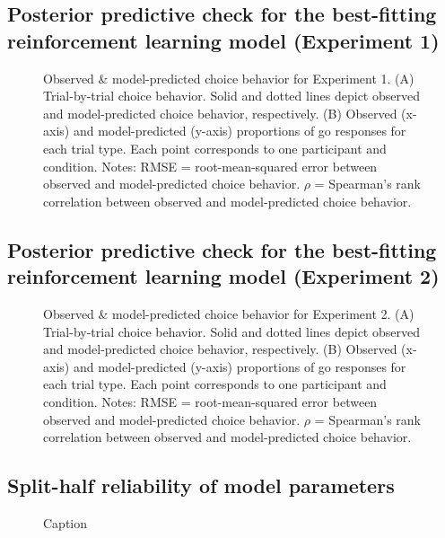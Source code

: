 \documentclass[a4paper,12pt]{article}
\begin{document}
\begin{refsection}[supp]
\break
\subsection*{Posterior predictive check for the best-fitting reinforcement learning model (Experiment 1)}

\begin{figure}[h]
    \centerline{}
    \caption{Observed \& model-predicted choice behavior for Experiment 1. (A) Trial-by-trial choice behavior. Solid and dotted lines depict observed and model-predicted choice behavior, respectively. (B) Observed (x-axis) and model-predicted (y-axis) proportions of go responses for each trial type. Each point corresponds to one participant and condition. Notes: RMSE = root-mean-squared error between observed and model-predicted choice behavior. $\rho$ = Spearman's rank correlation between observed and model-predicted choice behavior.}
    \label{fig:exp1_ppc}
\end{figure}

\clearpage
\subsection*{Posterior predictive check for the best-fitting reinforcement learning model (Experiment 2)}

\begin{figure}[h]
    \centerline{}
     \caption{Observed \& model-predicted choice behavior for Experiment 2. (A) Trial-by-trial choice behavior. Solid and dotted lines depict observed and model-predicted choice behavior, respectively. (B) Observed (x-axis) and model-predicted (y-axis) proportions of go responses for each trial type. Each point corresponds to one participant and condition. Notes: RMSE = root-mean-squared error between observed and model-predicted choice behavior. $\rho$ = Spearman's rank correlation between observed and model-predicted choice behavior.}
    \label{fig:exp2_ppc}
\end{figure}

\clearpage
\subsection*{Split-half reliability of model parameters}

\begin{figure}[h]
    \centerline{}
    \caption{Caption}
    \label{fig:figS04}
\end{figure}


\end{refsection}
\end{document}
